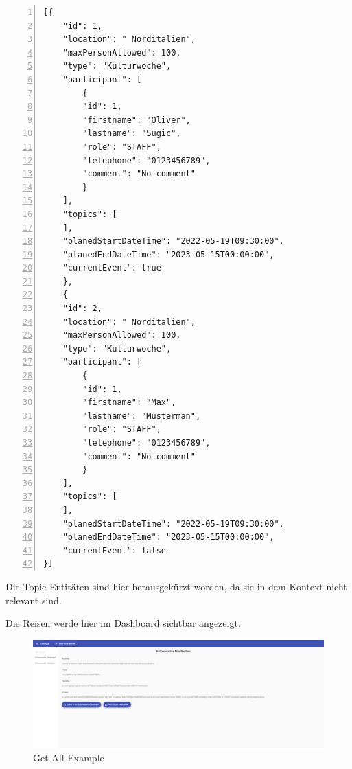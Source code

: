 \begin{lstlisting}[numbers=left, label={lst:json_gte_by_id}]
[{
    "id": 1,
    "location": " Norditalien",
    "maxPersonAllowed": 100,
    "type": "Kulturwoche",
    "participant": [
        {
        "id": 1,
        "firstname": "Oliver",
        "lastname": "Sugic",
        "role": "STAFF",
        "telephone": "0123456789",
        "comment": "No comment"
        }
    ],
    "topics": [
    ],
    "planedStartDateTime": "2022-05-19T09:30:00",
    "planedEndDateTime": "2023-05-15T00:00:00",
    "currentEvent": true
    },
    {
    "id": 2,
    "location": " Norditalien",
    "maxPersonAllowed": 100,
    "type": "Kulturwoche",
    "participant": [
        {
        "id": 1,
        "firstname": "Max",
        "lastname": "Musterman",
        "role": "STAFF",
        "telephone": "0123456789",
        "comment": "No comment"
        }
    ],
    "topics": [
    ],
    "planedStartDateTime": "2022-05-19T09:30:00",
    "planedEndDateTime": "2023-05-15T00:00:00",
    "currentEvent": false
}]
\end{lstlisting}

Die Topic Entitäten sind hier herausgekürzt worden, da sie in dem Kontext nicht relevant sind.


Die Reisen werde hier im Dashboard sichtbar angezeigt.

\begin{figure}[h]
    \centering
    \includegraphics[scale=0.2]{pics/dashboard.png}
    \caption{Get All Example}
    \label{lst:list_all_Example}
\end{figure}    

